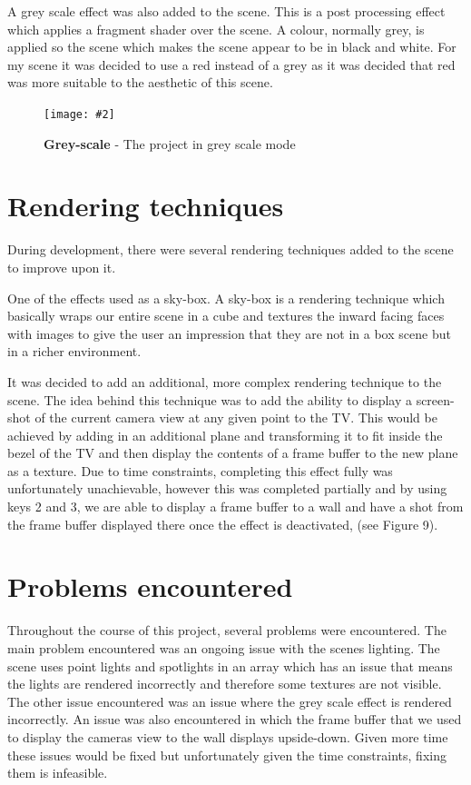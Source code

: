 \documentclass[10pt, a4paper]{article}
\newcommand{\figuremacro}[5]{
    \begin{figure}[#1]
        \centering
        \texttt{[image: \#2]}
        \caption[#3]{\textbf{#3}#4}
        \label{fig:#2}
    \end{figure}
}
\begin{document}
A grey scale effect was also added to the scene. This is a post processing effect which applies a fragment shader over the scene. A colour, normally grey, is applied so the scene which makes the scene appear to be in black and white. For my scene it was decided to use a red instead of a grey as it was decided that red was more suitable to the aesthetic of this scene.  

\figuremacro{h}{grayscale.png}{Grey-scale}{ - The project in grey scale mode}{1.0}


\section{Rendering techniques}
During development, there were several rendering techniques added to the scene to improve upon it. 

One of the effects used as a sky-box. A sky-box is a rendering technique which basically wraps our entire scene in a cube and textures the inward facing faces with images to give the user an impression that they are not in a box scene but in a richer environment.

It was decided to add an additional, more complex rendering technique to the scene. The idea behind this technique was to add the ability to display a screen-shot of the current camera view at any given point to the TV. This would be achieved by adding in an additional plane and transforming it to fit inside the bezel of the TV and then display the contents of a frame buffer to the new plane as a texture. Due to time constraints, completing this effect fully was unfortunately unachievable, however this was completed partially and by using keys 2 and 3, we are able to display a frame buffer to a wall and have a shot from the frame buffer displayed there once the effect is deactivated, (see Figure 9). 
	\section{Problems encountered}
	
Throughout the course of this project, several problems were encountered. The main problem encountered was an ongoing issue with the scenes lighting. The scene uses point lights and spotlights in an array which has an issue that means the lights are rendered incorrectly and therefore some textures are not visible. The other issue encountered was an issue where the grey scale effect is rendered incorrectly. An issue was also encountered in which the frame buffer that we used to display the cameras view to the wall displays upside-down. Given more time these issues would be fixed but unfortunately given the time constraints, fixing them is infeasible. 
	
\end{document}
